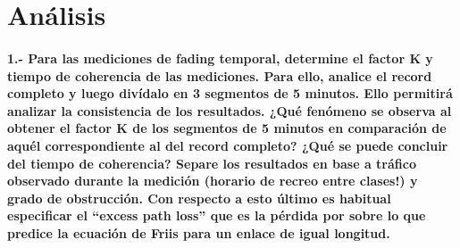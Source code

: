 \documentclass[12pt]{article}
\begin{document}
\newpage
\section{Análisis}

\paragraph{1.- Para las mediciones de fading temporal, determine el factor K y tiempo de coherencia 
de las mediciones. Para ello, analice el record completo y luego divídalo en 3 segmentos de 
5 minutos. Ello permitirá analizar la consistencia de los resultados. ¿Qué fenómeno se observa 
al obtener el factor K de los segmentos de 5 minutos en comparación de aquél correspondiente al 
del record completo? ¿Qué se puede concluir del tiempo de coherencia? Separe los resultados en 
base a tráfico observado durante la medición (horario de recreo entre clases!) y grado de 
obstrucción. Con respecto a esto último es habitual especificar el “excess path loss” que es 
la pérdida por sobre lo que predice la ecuación de Friis para un enlace de igual longitud.\\}
\small
\end{document}
